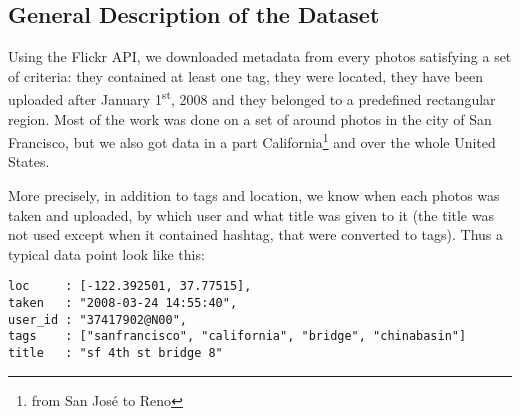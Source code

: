 \subsection{General Description of the Dataset}

Using the Flickr API, we downloaded metadata from every photos satisfying a
set of criteria: they contained at least one tag, they were located, they have
been uploaded after January 1\textsuperscript{st}, 2008 and they belonged to a
predefined rectangular region. Most of the work was done on a set of around
 photos in the city of San Francisco, but we also got data in
a part California\footnote{from San José to Reno} and over the whole United
States.

More precisely, in addition to tags and location, we know when each photos was
taken and uploaded, by which user and what title was given to it (the title
was not used except when it contained hashtag, that were converted to tags).
Thus a typical data point look like this:

\vspace{\baselineskip}
{\centering\begin{minipage}{0.7\linewidth}
  \begin{Verbatim}[frame=none, gobble=0]
loc     : [-122.392501, 37.77515],
taken   : "2008-03-24 14:55:40",
user_id : "37417902@N00",
tags    : ["sanfrancisco", "california", "bridge", "chinabasin"]
title   : "sf 4th st bridge 8"
  \end{Verbatim}
\end{minipage}\par}

